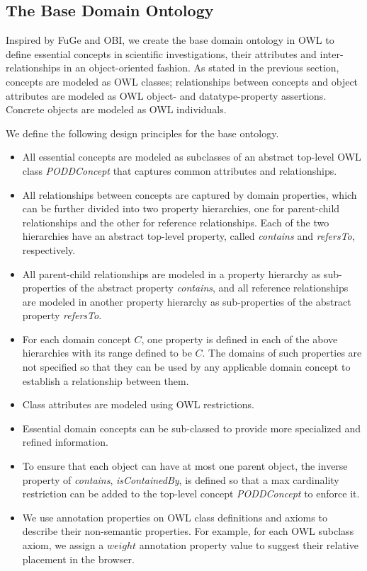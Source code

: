 \documentclass[preprint,12pt]{elsarticle}
\begin{document}
\subsection{The Base Domain Ontology}
Inspired by FuGe and OBI, we create the base domain ontology in OWL to define essential concepts in scientific investigations, their attributes and inter-relationships in an object-oriented fashion. As stated in the previous section, concepts are modeled as OWL classes; relationships between concepts and object attributes are modeled as OWL object- and datatype-property assertions. Concrete objects are modeled as OWL individuals.

We define the following design principles for the base ontology.

\begin{itemize}
\item All essential concepts are modeled as subclasses of an abstract top-level OWL class \emph{PODDConcept} that captures common attributes and relationships.

\item All relationships between concepts are captured by domain properties, which can be further divided into two property hierarchies, one for parent-child relationships and the other for reference relationships. Each of the two hierarchies have an abstract top-level property, called \emph{contains} and \emph{refersTo}, respectively. 

\item All parent-child relationships are modeled in a property hierarchy as sub-properties of the abstract property \emph{contains}, and all reference relationships are modeled in another property hierarchy as sub-properties of the abstract property \emph{refersTo}.

\item For each domain concept $C$, one property is defined in each of the above hierarchies with its range defined to be $C$. The domains of such properties are not specified so that they can be used by any applicable domain concept to establish a relationship between them.

\item Class attributes are modeled using OWL restrictions.

\item Essential domain concepts can be sub-classed to provide more specialized and refined information. 

\item To ensure that each object can have at most one parent object, the inverse property of \emph{contains}, \emph{isContainedBy}, is defined so that a max cardinality restriction can be added to the top-level concept \emph{PODDConcept} to enforce it. 

\item We use annotation properties on OWL class definitions and axioms to describe their non-semantic properties. For example, for each OWL subclass axiom, we assign a $weight$ annotation property value to suggest their relative placement in the browser.
\end{itemize}
\end{document}
